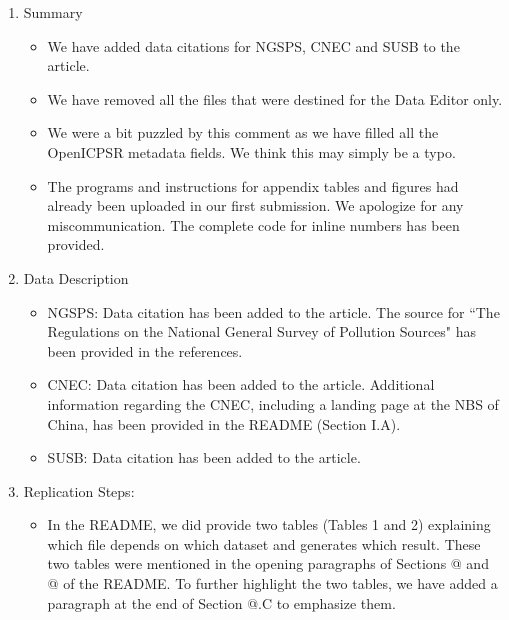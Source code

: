 \documentclass[twoside,12pt,leqno]{article}
\makeatletter
\newcommand*{\rom}[1]{\expandafter\@slowromancap\romannumeral #1@}
\makeatother
\begin{document}
\begin{enumerate}
    \item
    Summary
    \begin{itemize}
        \item
        We have added data citations for NGSPS, CNEC and SUSB to the article.
        \item
        We have removed all the files that were destined for the Data Editor only.
        \item
        We were a bit puzzled by this comment as we have filled all the OpenICPSR metadata fields. We think this may simply be a typo.
        \item
        The programs and instructions for appendix tables and figures had already been uploaded in our first submission. We apologize for any miscommunication. The complete code for inline numbers has been provided.
    \end{itemize}
    \item
    Data Description
    \begin{itemize}
        \item
        NGSPS: Data citation has been added to the article. The source for ``The Regulations on the National General Survey of Pollution Sources" has been provided in the references.
        \item
        CNEC: Data citation has been added to the article. Additional information regarding the CNEC, including a landing page at the NBS of China, has been provided in the README (Section I.A).
        \item
        SUSB: Data citation has been added to the article.
    \end{itemize}
    \item
    Replication Steps:
    \begin{itemize}
        \item
        In the README, we did provide two tables (Tables 1 and 2) explaining which file depends on which dataset and generates which result. These two tables were mentioned in the opening paragraphs of Sections \rom{2} and \rom{3} of the README. To further highlight the two tables, we have added a paragraph at the end of Section \rom{1}.C to emphasize them.

\end{itemize}
\end{enumerate}
\end{document}
